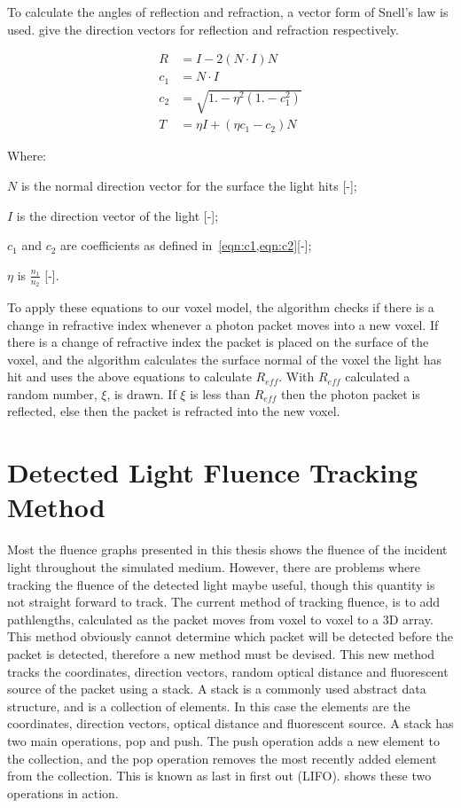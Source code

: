 \begin{appendices}
To calculate the angles of reflection and refraction, a vector form of Snell's law is used.
 give the direction vectors for reflection and refraction respectively.


\begin{align}
R&= I - 2(N \cdot I)N\label{eqn:refl}\\
c_1 &= N \cdot I\label{eqn:c1}\\
c_2 &= \sqrt{1. - \eta^2 (1. - c_1^2)}\label{eqn:c2}\\
T &= \eta  I + (\eta c_1-c_2)  N\label{eqn:refract}
\end{align}


\noindent Where:

\indent $N$ is the normal direction vector for the surface the light hits [-];

\indent $I$ is the direction vector of the light [-];

\indent $c_1$ and $c_2$ are coefficients as defined in~\cref{eqn:c1,eqn:c2}[-];

\indent $\eta$ is $\tfrac{n_1}{n_2}$ [-].

\medskip

To apply these equations to our voxel model, the algorithm checks if there is a change in refractive index whenever a photon packet moves into a new voxel.
If there is a change of refractive index the packet is placed on the surface of the voxel, and the algorithm calculates the surface normal of the voxel the light has hit and uses the above equations to calculate $R_{eff}$.
With $R_{eff}$ calculated a random number, $\xi$, is drawn.
If $\xi$ is less than $R_{eff}$ then the photon packet is reflected, else then the packet is refracted into the new voxel.

\chapter{Detected Light Fluence Tracking Method}
\label{app:lightdect}

Most the fluence graphs presented in this thesis shows the fluence of the incident light throughout the simulated medium.
However, there are problems where tracking the fluence of the detected light maybe useful, though this quantity is not straight forward to track.
The current method of tracking fluence, is to add pathlengths, calculated as the packet moves from voxel to voxel to a 3D array. 
This method obviously cannot determine which packet will be detected before the packet is detected, therefore a new method must be devised.
This new method tracks the coordinates, direction vectors, random optical distance and fluorescent source of the packet using a stack.
A stack is a commonly used abstract data structure, and is a collection of elements.
In this case the elements are the coordinates, direction vectors, optical distance and fluorescent source.
A stack has two main operations, pop and push.
The push operation adds a new element to the collection, and the pop operation removes the most recently added element from the collection.
This is known as last in first out (LIFO).
 shows these two operations in action.


\end{appendices}
